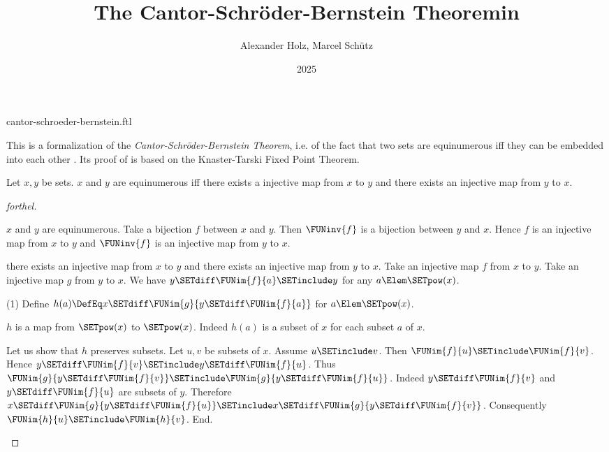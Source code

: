 \documentclass{stex}
\title{The Cantor-Schröder-Bernstein Theoremin \Naproche}
\author{Alexander Holz, Marcel Schütz}
\date{2025}
\begin{document}
\begin{smodule}{cantor-schroeder-bernstein.ftl}
\maketitle



\noindent This is a formalization of the \textit{Cantor-Schröder-Bernstein
Theorem}, i.e. of the fact that two sets are equinumerous iff they can be
embedded into each other \cite{Schroeder2012}.
Its proof of is based on the Knaster-Tarski Fixed Point Theorem.

\begin{theorem}[forthel,title=Cantor-Schröder-Bernstein,name=Cantor-Schroeder-Bernstein]
  Let $x,y$ be sets.
  $x$ and $y$ are equinumerous iff there exists a injective map from $x$ to $y$ and there exists an injective map from $y$ to $x$.
\end{theorem}
\begin{proof}[forthel]
  \begin{case}{$x$ and $y$ are equinumerous.}
    Take a bijection $f$ between $x$ and $y$.
    Then $\FUNinv{f}$ is a bijection between $y$ and $x$.
    Hence $f$ is an injective map from $x$ to $y$ and $\FUNinv{f}$ is an
    injective map from $y$ to $x$.
  \end{case}

  \begin{case}{there exists an injective map from $x$ to $y$ and there exists an injective map from $y$ to $x$.}
    Take an injective map $f$ from $x$ to $y$.
    Take an injective map $g$ from $y$ to $x$.
    We have $y \SETdiff \FUNim{f}{a} \SETinclude y$ for any $a \Elem \SETpow(x)$.

    (1) Define $h(a) \DefEq x \SETdiff \FUNim{g}{y \SETdiff \FUNim{f}{a}}$ for $a \Elem \SETpow(x)$.

    $h$ is a map from $\SETpow(x)$ to $\SETpow(x)$.
    Indeed $h(a)$ is a subset of $x$ for each subset $a$ of $x$.

    Let us show that $h$ preserves subsets.
      Let $u, v$ be subsets of $x$.
      Assume $u \SETinclude v$.
      Then $\FUNim{f}{u} \SETinclude \FUNim{f}{v}$.
      Hence $y \SETdiff \FUNim{f}{v} \SETinclude y \SETdiff \FUNim{f}{u}$.
      Thus $\FUNim{g}{y \SETdiff \FUNim{f}{v}} \SETinclude\linebreak \FUNim{g}{y \SETdiff \FUNim{f}{u}}$.
      Indeed $y \SETdiff \FUNim{f}{v}$ and $y \SETdiff \FUNim{f}{u}$ are subsets of $y$.
      Therefore\linebreak $x \SETdiff \FUNim{g}{y \SETdiff \FUNim{f}{u}} \SETinclude x \SETdiff \FUNim{g}{y \SETdiff \FUNim{f}{v}}$.
      Consequently $\FUNim{h}{u} \SETinclude \FUNim{h}{v}$.
    End.


\end{case}
\end{proof}
\end{smodule}
\end{document}
